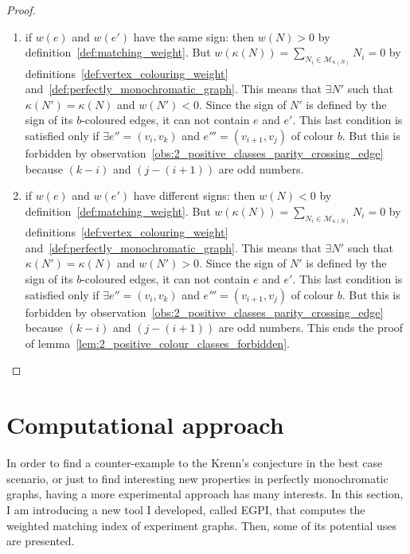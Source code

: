 \begin{proof}
    \begin{enumerate}
        \item if $w(e)$ and $w(e')$ have the same sign: then $w(N) > 0$ by definition~\ref{def:matching_weight}.    %
        But $w(\kappa(N)) = \sum\limits_{N_i \in \mathcal{M}_{\kappa(N)}} N_i = 0$ by definitions~\ref{def:vertex_colouring_weight} and~\ref{def:perfectly_monochromatic_graph}.
        This means that $\exists N'$ such that $\kappa(N') = \kappa(N)$ and $w(N') < 0$.
        Since the sign of $N'$ is defined by the sign of its $b$-coloured edges, it can not contain $e$ and $e'$.
        This last condition is satisfied only if $\exists e'' = (v_i, v_k)$ and $e''' = (v_{i+1}, v_j)$ of colour $b$.
        But this is forbidden by observation~\ref{obs:2_positive_classes_parity_crossing_edge} because $(k - i)$ and $\left(j - (i + 1)\right)$ are odd numbers.

        \item if $w(e)$ and $w(e')$ have different signs: then $w(N) < 0$ by definition~\ref{def:matching_weight}.
        But $w(\kappa(N)) = \sum\limits_{N_i \in \mathcal{M}_{\kappa(N)}} N_i = 0$ by definitions~\ref{def:vertex_colouring_weight} and~\ref{def:perfectly_monochromatic_graph}.
        This means that $\exists N'$ such that $\kappa(N') = \kappa(N)$ and $w(N') > 0$.
        Since the sign of $N'$ is defined by the sign of its $b$-coloured edges, it can not contain $e$ and $e'$.
        This last condition is satisfied only if $\exists e'' = (v_i, v_k)$ and $e''' = (v_{i+1}, v_j)$ of colour $b$.
        But this is forbidden by observation~\ref{obs:2_positive_classes_parity_crossing_edge} because $(k - i)$ and $\left(j - (i + 1)\right)$ are odd numbers.
        This ends the proof of lemma~\ref{lem:2_positive_colour_classes_forbidden}.
    \end{enumerate}
\end{proof}


\section{Computational approach}
\label{sec:computational_approach}

In order to find a counter-example to the Krenn's conjecture in the best case scenario, or just to find interesting new properties in perfectly monochromatic graphs, having a more experimental approach has many interests.
In this section, I am introducing a new tool I developed, called EGPI, that computes the weighted matching index of experiment graphs.
Then, some of its potential uses are presented.

